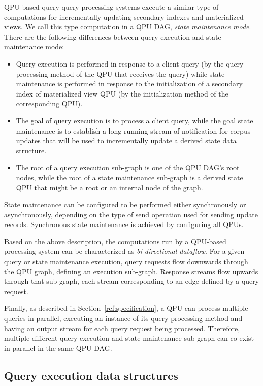 QPU-based query query processing systems execute a similar type of computations for incrementally updating
secondary indexes and materialized views.
We call this type computation in a QPU DAG, \textit{state maintenance mode}.
There are the following differences between query execution and state maintenance mode:
\begin{itemize}
  \item Query execution is performed in response to a client query (by the query processing method of the QPU that receives the query)
  while state maintenance is performed in response to the initialization of a secondary index of materialized view QPU
  (by the initialization method of the corresponding QPU).
  \item The goal of query execution is to process a client query,
  while the goal state maintenance is to establish a long running stream of notification for corpus updates that
  will be used to incrementally update a derived state data structure.
  \item The root of a query execution sub-graph is one of the QPU DAG's root nodes,
  while the root of a state maintenance sub-graph is a derived state QPU that might be a root or an internal node of the
  graph.
\end{itemize}

State maintenance can be configured to be performed either synchronously or asynchronously, depending on the type of send
operation used for sending update records.
Synchronous state maintenance is achieved by configuring all QPUs.

Based on the above description, the computations run by a QPU-based processing system can be characterized as
\textit{bi-directional dataflow}.
For a given query or state maintenance execution,
query requests flow downwards through the QPU graph, defining an execution sub-graph.
Response streams flow upwards through that sub-graph, each stream corresponding to an edge defined by a query request.

Finally, as described in Section~\ref{ref:specification}, a QPU can process multiple queries in parallel,
executing an instance of its query processing method and having an output stream for each query request being processed.
Therefore, multiple different query execution and state maintenance sub-graph can co-exist in parallel in the same QPU DAG.

\subsection{Query execution data structures}

